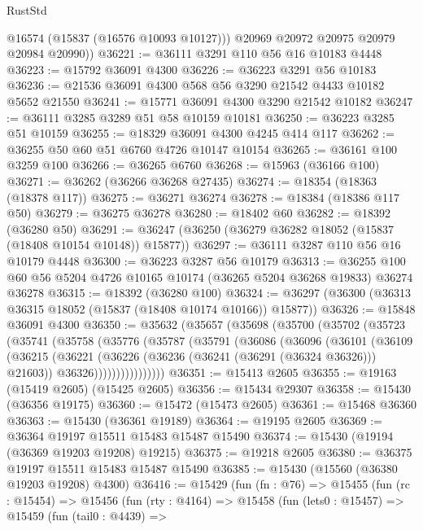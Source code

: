 \begin{lexlean}{RustStd}
\begin{coremodule}
{\begin{coremodule}
{{{{{{{{{{{{{{{{{{{{{{{{{{{{{{{{{{{{{{{{{{{{{{{{{{{{{{{{{{{{          @16574
          (@15837 (@16576 @10093 @10127)))
        @20969
        @20972
        @20975
        @20979
        @20984
        @20990))
@36221 := @36111 @3291 @110 @56 @16 @10183 @4448
@36223 := @15792 @36091 @4300
@36226 := @36223 @3291 @56 @10183
@36236 := @21536 @36091 @4300 @568 @56 @3290 @21542 @4433 @10182 @5652 @21550
@36241 := @15771 @36091 @4300 @3290 @21542 @10182
@36247 := @36111 @3285 @3289 @51 @58 @10159 @10181
@36250 := @36223 @3285 @51 @10159
@36255 := @18329 @36091 @4300 @4245 @414 @117
@36262 := @36255 @50 @60 @51 @6760 @4726 @10147 @10154
@36265 := @36161 @100 @3259 @100
@36266 := @36265 @6760
@36268 := @15963 (@36166 @100)
@36271 := @36262 (@36266 @36268 @27435)
@36274 := @18354 (@18363 (@18378 @117))
@36275 := @36271 @36274
@36278 := @18384 (@18386 @117 @50)
@36279 := @36275 @36278
@36280 := @18402 @60
@36282 := @18392 (@36280 @50)
@36291 := @36247 (@36250 (@36279 @36282 @18052 (@15837 (@18408 @10154 @10148)) @15877))
@36297 := @36111 @3287 @110 @56 @16 @10179 @4448
@36300 := @36223 @3287 @56 @10179
@36313 := @36255 @100 @60 @56 @5204 @4726 @10165 @10174 (@36265 @5204 @36268 @19833) @36274 @36278
@36315 := @18392 (@36280 @100)
@36324 := @36297 (@36300 (@36313 @36315 @18052 (@15837 (@18408 @10174 @10166)) @15877))
@36326 := @15848 @36091 @4300
@36350 := @35632
    (@35657
      (@35698
        (@35700
          (@35702
            (@35723
              (@35741
                (@35758
                  (@35776
                    (@35787
                      (@35791
                        (@36086
                          (@36096
                            (@36101
                              (@36109
                                (@36215
                                  (@36221
                                    (@36226 (@36236 (@36241 (@36291 (@36324 @36326))) @21603))
                                    @36326))))))))))))))))
@36351 := @15413 @2605
@36355 := @19163 (@15419 @2605) (@15425 @2605)
@36356 := @15434 @29307
@36358 := @15430 (@36356 @19175)
@36360 := @15472 (@15473 @2605)
@36361 := @15468 @36360
@36363 := @15430 (@36361 @19189)
@36364 := @19195 @2605
@36369 := @36364 @19197 @15511 @15483 @15487 @15490
@36374 := @15430 (@19194 (@36369 @19203 @19208) @19215)
@36375 := @19218 @2605
@36380 := @36375 @19197 @15511 @15483 @15487 @15490
@36385 := @15430 (@15560 (@36380 @19203 @19208) @4300)
@36416 := @15429
    (fun (fn : @76) =>
    @15455
      (fun (rc : @15454) =>
      @15456
        (fun (rty : @4164) =>
        @15458
          (fun (lets0 : @15457) =>
          @15459
            (fun (tail0 : @4439) =>
}}}}}}}}}}}}}}}}}}}}}}}}}}}}}}}}}}}}}}}}}}}}}}}}}}}}}}}}}}}}
\end{coremodule}}
\end{coremodule}
\end{lexlean}
